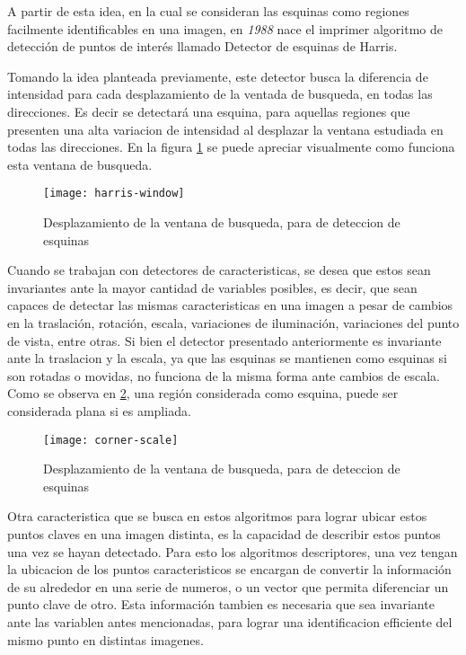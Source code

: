 A partir de esta idea, en la cual se consideran las esquinas como regiones facilmente identificables en una imagen, en \textit{1988} nace el imprimer algoritmo de detección de puntos de interés \cite{harris} llamado Detector de esquinas de Harris.

Tomando la idea planteada previamente, este detector busca la diferencia de intensidad para cada desplazamiento de la ventada de busqueda, en todas las direcciones. Es decir se detectará una esquina, para aquellas regiones que presenten una alta variacion de intensidad al desplazar la ventana estudiada en todas las direcciones. En la figura \ref{imagen:harris-window} se puede apreciar visualmente como funciona esta ventana de busqueda.

\begin{figure}[H]
	\centering
	\texttt{[image: harris-window]}
	\caption[Deteccion de esquinas]{Desplazamiento de la ventana de busqueda, para de deteccion de esquinas}
	\label{imagen:harris-window}
\end{figure}

Cuando se trabajan con detectores de caracteristicas, se desea que estos sean invariantes ante la mayor cantidad de variables posibles, es decir, que sean capaces de detectar las mismas caracteristicas en una imagen a pesar de cambios en la traslación, rotación, escala, variaciones de iluminación, variaciones del punto de vista, entre otras. Si bien el detector presentado anteriormente es invariante ante la traslacion y la escala, ya que las esquinas se mantienen como esquinas si son rotadas o movidas, no funciona de la misma forma ante cambios de escala. Como se observa en \ref{imagen:corner-scale}, una región considerada como esquina, puede ser considerada plana si es ampliada.

\begin{figure}[H]
	\centering
	\texttt{[image: corner-scale]}
	\caption[Deteccion de esquinas]{Desplazamiento de la ventana de busqueda, para de deteccion de esquinas}
	\label{imagen:corner-scale}
\end{figure}

Otra caracteristica que se busca en estos algoritmos para lograr ubicar estos puntos claves en una imagen distinta, es la capacidad de describir estos puntos una vez se hayan detectado. Para esto los algoritmos descriptores, una vez tengan la ubicacion de los puntos caracteristicos se encargan de convertir la información de su alrededor en una serie de numeros, o un vector que permita diferenciar un punto clave de otro. Esta información tambien es necesaria que sea invariante ante las variablen antes mencionadas, para lograr una identificacion efficiente del mismo punto en distintas imagenes.

